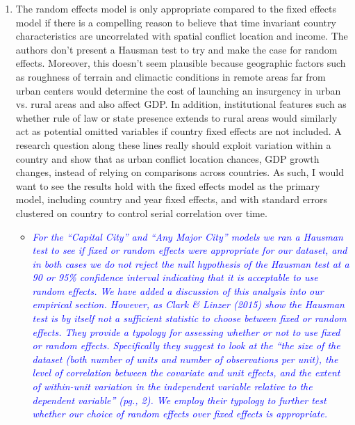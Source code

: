 \begin{enumerate}
\item The random effects model is only appropriate compared to the fixed effects model if there is a compelling reason to believe that time invariant country characteristics are uncorrelated with spatial conflict location and income. The authors don’t present a Hausman test to try and make the case for random effects. Moreover, this doesn’t seem plausible because geographic factors such as roughness of terrain and climactic conditions in remote areas far from urban centers would determine the cost of launching an insurgency in urban vs. rural areas and also affect GDP. In addition, institutional features such as whether rule of law or state presence extends to rural areas would similarly act as potential omitted variables if country fixed effects are not included. A research question along these lines really should exploit variation within a country and show that as urban conflict location chances, GDP growth changes, instead of relying on comparisons across countries. As such, I would want to see the results hold with the fixed effects model as the primary model, including country and year fixed effects, and with standard errors clustered on country to control serial correlation over time.

\begin{itemize}
\item \textcolor{blue}{\emph{
	For the ``Capital City'' and ``Any Major City'' models we ran a Hausman test to see if fixed or random effects were appropriate for our dataset, and in both cases we do not reject the null hypothesis of the Hausman test at a 90 or 95\% confidence interval indicating that it is acceptable to use random effects. We have added a discussion of this analysis into our empirical section.  
	However, as Clark \& Linzer (2015) show the Hausman test is by itself not a sufficient statistic to choose between fixed or random effects. They provide a typology for assessing whether or not to use fixed or random effects. Specifically they suggest to look at the ``the size of the dataset (both number of units and number of observations per unit), the level of correlation between the covariate and unit effects, and the extent of within-unit variation in the independent variable relative to the dependent variable'' (pg., 2). We employ their typology to further test whether our choice of random effects over fixed effects is appropriate. 
}}
\end{itemize}


\end{enumerate}
